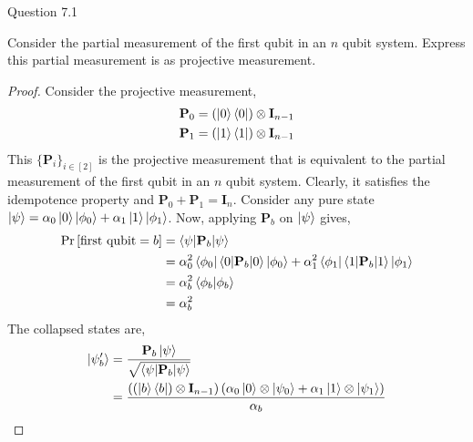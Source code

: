 \begin{solution}{Question 7.1}\label{ques:71}
    \begin{question}
        Consider the partial measurement of the first qubit in an $n$ qubit system. Express this partial measurement is as projective measurement.
    \end{question}
    \tcblower{}
    \begin{proof}
        Consider the projective measurement,
        \begin{equation}
            \begin{split}
                \mathbf{P}_0 = \left(\ket{0}\bra{0}\right)\otimes \mathbf{I}_{n-1}\\
                \mathbf{P}_1 = \left(\ket{1}\bra{1}\right)\otimes \mathbf{I}_{n-1}
            \end{split}
        \end{equation}
        This $\{\mathbf{P}_i\}_{i\in [2]}$ is the projective measurement that is equivalent to the partial measurement of the first qubit in an $n$ qubit system. Clearly, it satisfies the idempotence property and $\mathbf{P}_0 + \mathbf{P}_1 = \mathbf{I}_n$. Consider any pure state $\ket{\psi} = \alpha_0\ket{0}\ket{\phi_0} + \alpha_1\ket{1}\ket{\phi_1}$. Now, applying $\mathbf{P}_b$ on $\ket{\psi}$ gives,
        \begin{equation}
            \begin{split}
                \Pr\left[ \text{first qubit} = b \right] &= \braket{\psi | \mathbf{P}_b | \psi}\\
                                              &= \alpha_0^2\braket{\phi_0|\braket{0 | \mathbf{P}_b | 0}|\phi_0} + \alpha_1^2\braket{\phi_1|\braket{1 | \mathbf{P}_b | 1}|\phi_1}\\
                                              &= \alpha_b^2\braket{\phi_b | \phi_b}\\
                                              &= \alpha_b^2\\
            \end{split}
        \end{equation}
        The collapsed states are,
        \begin{equation}
            \begin{split}
                \ket{\psi'_b} &= \frac{\mathbf{P}_b\ket{\psi}}{\sqrt{\braket{\psi | \mathbf{P}_b | \psi}}}\\
                              &= \frac{\left(\left(\ket{b}\bra{b}\right)\otimes \mathbf{I}_{n-1}\right)\left(\alpha_0\ket{0}\otimes\ket{\psi_0} + \alpha_1\ket{1}\otimes\ket{\psi_1}\right)}{\alpha_b}\\

\end{split}
\end{equation}
\end{proof}
\end{solution}
